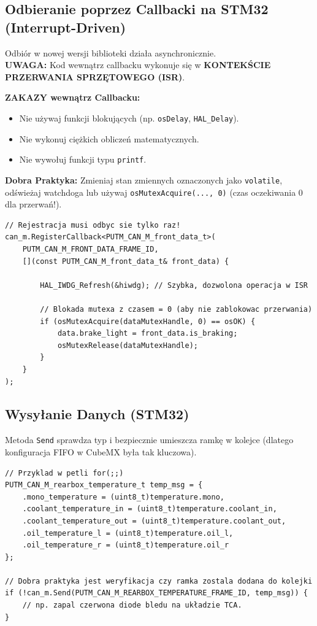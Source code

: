 \documentclass[a4paper,11pt]{article}
\begin{document}
\begin{stm32box}
\subsection*{Odbieranie poprzez Callbacki na STM32 (Interrupt-Driven)}
Odbiór w nowej wersji biblioteki działa asynchronicznie.\\
\textcolor{warningred}{\textbf{UWAGA:}} Kod wewnątrz callbacku wykonuje się w \textbf{KONTEKŚCIE PRZERWANIA SPRZĘTOWEGO (ISR)}.

\textbf{ZAKAZY wewnątrz Callbacku:}
\begin{itemize}
    \item Nie używaj funkcji blokujących (np. \texttt{osDelay}, \texttt{HAL\_Delay}).
    \item Nie wykonuj ciężkich obliczeń matematycznych.
    \item Nie wywołuj funkcji typu \texttt{printf}.
\end{itemize}

\textbf{Dobra Praktyka:} Zmieniaj stan zmiennych oznaczonych jako \texttt{volatile}, odświeżaj watchdoga lub używaj \texttt{osMutexAcquire(..., 0)} (czas oczekiwania $0$ dla przerwań!).

\begin{lstlisting}[caption=Rejestracja callbacku i bezpieczne operacje na STM32]
// Rejestracja musi odbyc sie tylko raz!
can_m.RegisterCallback<PUTM_CAN_M_front_data_t>(
    PUTM_CAN_M_FRONT_DATA_FRAME_ID, 
    [](const PUTM_CAN_M_front_data_t& front_data) {
        
        HAL_IWDG_Refresh(&hiwdg); // Szybka, dozwolona operacja w ISR

        // Blokada mutexa z czasem = 0 (aby nie zablokowac przerwania)
        if (osMutexAcquire(dataMutexHandle, 0) == osOK) {
            data.brake_light = front_data.is_braking;
            osMutexRelease(dataMutexHandle);
        }
    }
);
\end{lstlisting}

\subsection*{Wysyłanie Danych (STM32)}
Metoda \texttt{Send} sprawdza typ i bezpiecznie umieszcza ramkę w kolejce (dlatego konfiguracja FIFO w CubeMX była tak kluczowa).

\begin{lstlisting}
// Przyklad w petli for(;;)
PUTM_CAN_M_rearbox_temperature_t temp_msg = {
    .mono_temperature = (uint8_t)temperature.mono,
    .coolant_temperature_in = (uint8_t)temperature.coolant_in,
    .coolant_temperature_out = (uint8_t)temperature.coolant_out,
    .oil_temperature_l = (uint8_t)temperature.oil_l,
    .oil_temperature_r = (uint8_t)temperature.oil_r
};

// Dobra praktyka jest weryfikacja czy ramka zostala dodana do kolejki
if (!can_m.Send(PUTM_CAN_M_REARBOX_TEMPERATURE_FRAME_ID, temp_msg)) {
    // np. zapal czerwona diode bledu na układzie TCA.
}
\end{lstlisting}
\end{stm32box}
\end{document}
